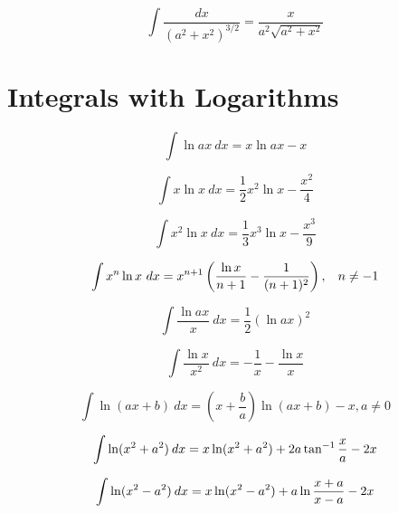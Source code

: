 \documentclass[12pt,letterpaper,leqno]{article}
\begin{document}
\begin{equation}\label{eq:Winokur2}
\int\frac{dx}{(a^2+x^2)^{3/2}}=\frac{x}{a^2\sqrt{a^2+x^2}}
\end{equation}



\section*{Integrals with Logarithms}

\begin{equation}
\int \ln ax\  dx = x \ln ax - x 
\end{equation}

\begin{equation}
\int x \ln x \ dx = \frac{1}{2} x^2 \ln x-\frac{x^2}{4}
\end{equation}

\begin{equation}
\int x^2 \ln x \ dx = \frac{1}{3} x^3 \ln x-\frac{x^3}{9}
\end{equation}

\begin{equation}
\int x^n \ln x\ dx = x^{n+1}\left( \dfrac{\ln x}{n+1}-\dfrac{1}{(n+1)^2}\right),\hspace{2ex} n\neq -1
\end{equation}


\begin{equation}
\int \frac{\ln ax}{x}\ dx = \frac{1}{2}\left ( \ln ax \right)^2 
\end{equation}

\begin{equation}
\int \frac{\ln x}{x^2}\ dx = -\frac{1}{x}-\frac{\ln x}{x}
\end{equation}

\begin{equation}
\int \ln (ax + b) \ dx = \left ( x + \frac{b}{a} \right) \ln (ax+b) - x , a\ne 0
\end{equation}

\begin{equation}
\int \ln  ( x^2 + a^2 )\hspace{.5ex} {dx} = x \ln (x^2 + a^2  ) +2a\tan^{-1} \frac{x}{a} - 2x 
\end{equation}

\begin{equation}
\int \ln  ( x^2 - a^2 )\hspace{.5ex} {dx} = x \ln (x^2 - a^2  ) +a\ln \frac{x+a}{x-a} - 2x 
\end{equation}
\end{document}
